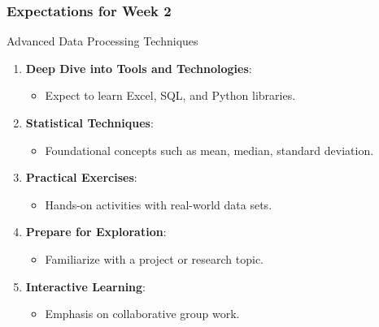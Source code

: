 \documentclass[aspectratio=169]{beamer}
\begin{document}
\begin{frame}[fragile]
    \frametitle{Expectations for Week 2}
    \begin{block}{Advanced Data Processing Techniques}
        \begin{enumerate}
            \item \textbf{Deep Dive into Tools and Technologies}:
            \begin{itemize}
                \item Expect to learn Excel, SQL, and Python libraries.
            \end{itemize}
            \item \textbf{Statistical Techniques}:
            \begin{itemize}
                \item Foundational concepts such as mean, median, standard deviation.
            \end{itemize}
            \item \textbf{Practical Exercises}:
            \begin{itemize}
                \item Hands-on activities with real-world data sets.
            \end{itemize}
            \item \textbf{Prepare for Exploration}:
            \begin{itemize}
                \item Familiarize with a project or research topic.
            \end{itemize}
            \item \textbf{Interactive Learning}:
            \begin{itemize}
                \item Emphasis on collaborative group work.
            \end{itemize}
        \end{enumerate}
    \end{block}
\end{frame}
\end{document}
